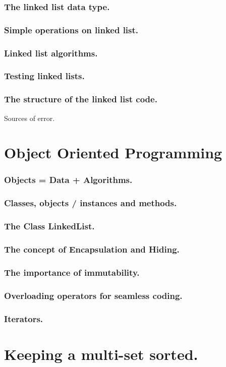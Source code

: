 \documentclass{beamer} %
\begin{document}
\begin{frame}
\frametitle{The linked list data type.}
\end{frame}

\begin{frame}
\frametitle{Simple operations on linked list.}
\end{frame}

\begin{frame}
\frametitle{Linked list algorithms.}
\end{frame}

\begin{frame}
\frametitle{Testing linked lists.}
\end{frame}


\begin{frame}
\frametitle{The structure of the linked list code.}

 Sources of error.
\end{frame}

\section{Object Oriented Programming}

\begin{frame}
\frametitle{Objects = Data + Algorithms.}
\end{frame}

\begin{frame}
\frametitle{Classes, objects / instances and methods.}
\end{frame}

\begin{frame}
\frametitle{The Class LinkedList.}
\end{frame}

\begin{frame}
\frametitle{The concept of Encapsulation and Hiding.}
\end{frame}

\begin{frame}
\frametitle{The importance of immutability.}
\end{frame}

\begin{frame}
\frametitle{Overloading operators for seamless coding.}
\end{frame}

\begin{frame}
\frametitle{Iterators.}
\end{frame}

\section{Keeping a multi-set sorted.}
\end{document}

